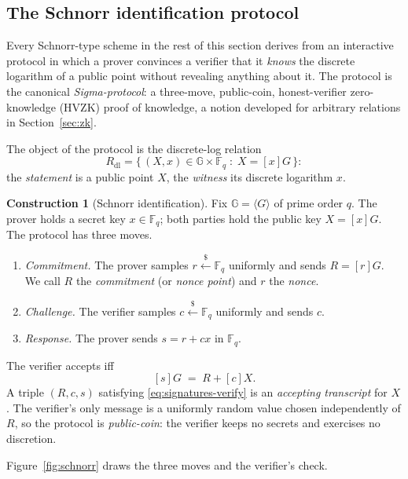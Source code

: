 \documentclass[11pt,a4paper]{article}
\theoremstyle{definition}
\newtheorem{construction}[theorem]{Construction}
\theoremstyle{remark}
\newcommand{\G}{\ensuremath{\mathbb{G}}}
\newcommand{\Fq}{\ensuremath{\mathbb{F}_{q}}}
\begin{document}
\subsection{The Schnorr identification protocol}
\label{signatures:subsec:schnorrid}

Every Schnorr-type scheme in the rest of this section derives from an
interactive protocol in which a prover convinces a verifier that it
\emph{knows}
the discrete logarithm of a public point without revealing anything
about it. The protocol is the canonical \emph{Sigma-protocol}: a
three-move, public-coin, honest-verifier zero-knowledge (HVZK) proof of
knowledge, a notion developed for arbitrary relations in
Section~\ref{sec:zk}.

The object of the protocol is the discrete-log relation
\[
R_{\mathrm{dl}}
= \bigl\{\, (X, x) \in \G \times \Fq \;:\; X = [x]G \,\bigr\}:
\]
the \emph{statement} is a public point \(X\), the \emph{witness} its
discrete logarithm \(x\).

\begin{construction}[Schnorr identification]
\label{signatures:con:schnorrid}
Fix \(\G = \langle G \rangle\) of prime order \(q\). The prover
holds a secret key \(x \in \Fq\); both parties hold the public key
\(X = [x]G\). The protocol has three moves.
\begin{enumerate}
\item \emph{Commitment.} The prover samples
  \(r \xleftarrow{\$} \Fq\) uniformly and sends \(R = [r]G\). We
  call \(R\) the \emph{commitment} (or \emph{nonce point}) and \(r\)
  the \emph{nonce}.
\item \emph{Challenge.} The verifier samples
  \(c \xleftarrow{\$} \Fq\) uniformly and sends \(c\).
\item \emph{Response.} The prover sends \(s = r + cx\) in \(\Fq\).
\end{enumerate}
The verifier accepts iff
\begin{equation}\label{eq:signatures-verify}
[s]G \;=\; R + [c]X .
\end{equation}
A triple \((R, c, s)\) satisfying \eqref{eq:signatures-verify} is an
\emph{accepting transcript} for \(X\). The verifier's only message
is a uniformly random value chosen independently of \(R\), so the
protocol is \emph{public-coin}: the verifier keeps no secrets and
exercises no discretion.
\end{construction}

Figure~\ref{fig:schnorr} draws the three moves and the verifier's check.
\end{document}
